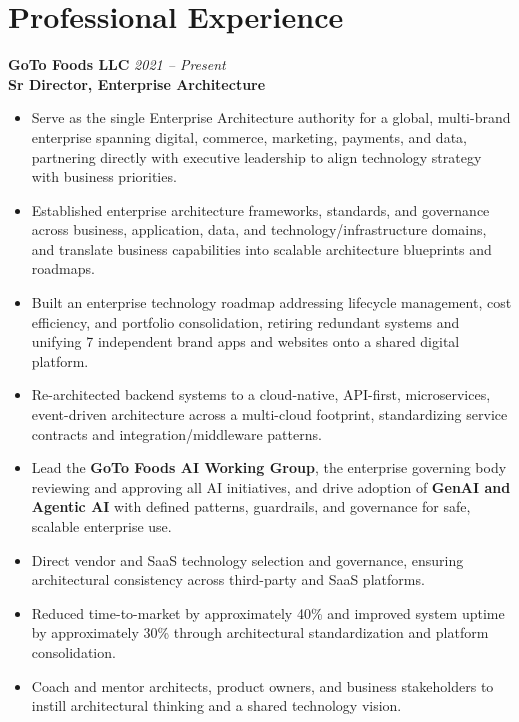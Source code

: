 \documentclass[11pt]{article}
\begin{document}
\section*{Professional Experience}

\textbf{GoTo Foods LLC} \hfill \textit{2021 -- Present} \\
\textbf{Sr Director, Enterprise Architecture}

\begin{itemize}
  \item Serve as the single Enterprise Architecture authority for a global, multi-brand enterprise spanning digital, commerce, marketing, payments, and data, partnering directly with executive leadership to align technology strategy with business priorities.
  \item Established enterprise architecture frameworks, standards, and governance across business, application, data, and technology/infrastructure domains, and translate business capabilities into scalable architecture blueprints and roadmaps.
  \item Built an enterprise technology roadmap addressing lifecycle management, cost efficiency, and portfolio consolidation, retiring redundant systems and unifying 7 independent brand apps and websites onto a shared digital platform.
  \item Re-architected backend systems to a cloud-native, API-first, microservices, event-driven architecture across a multi-cloud footprint, standardizing service contracts and integration/middleware patterns.
  \item Lead the \textbf{GoTo Foods AI Working Group}, the enterprise governing body reviewing and approving all AI initiatives, and drive adoption of \textbf{GenAI and Agentic AI} with defined patterns, guardrails, and governance for safe, scalable enterprise use.
  \item Direct vendor and SaaS technology selection and governance, ensuring architectural consistency across third-party and SaaS platforms.
  \item Reduced time-to-market by approximately 40\% and improved system uptime by approximately 30\% through architectural standardization and platform consolidation.
  \item Coach and mentor architects, product owners, and business stakeholders to instill architectural thinking and a shared technology vision.
\end{itemize}
\end{document}
